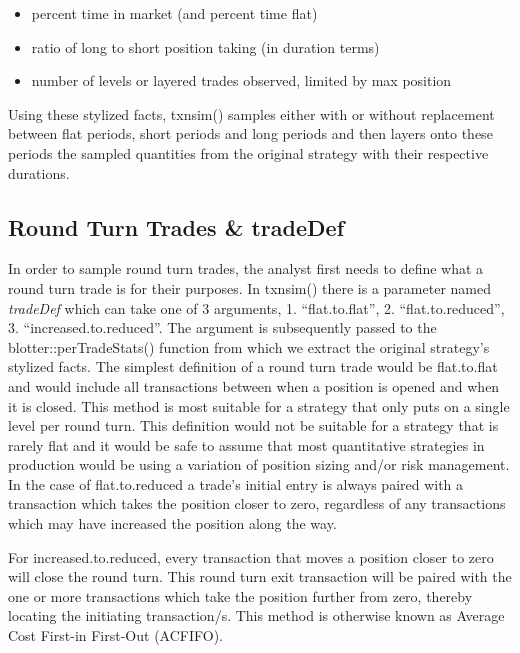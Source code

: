 \begin{itemize}
\tightlist
\item
  percent time in market (and percent time flat)
\item
  ratio of long to short position taking (in duration terms)
\item
  number of levels or layered trades observed, limited by max position
\end{itemize}

Using these stylized facts, txnsim() samples either with or without
replacement between flat periods, short periods and long periods and
then layers onto these periods the sampled quantities from the original
strategy with their respective durations.

\hypertarget{round-turn-trades-tradedef}{%
\subsection{Round Turn Trades \&
tradeDef}\label{round-turn-trades-tradedef}}

In order to sample round turn trades, the analyst first needs to define
what a round turn trade is for their purposes. In txnsim() there is a
parameter named \emph{tradeDef} which can take one of 3 arguments, 1.
``flat.to.flat'', 2. ``flat.to.reduced'', 3. ``increased.to.reduced''.
The argument is subsequently passed to the blotter::perTradeStats()
function from which we extract the original strategy's stylized facts.
The simplest definition of a round turn trade would be flat.to.flat and
would include all transactions between when a position is opened and
when it is closed. This method is most suitable for a strategy that only
puts on a single level per round turn. This definition would not be
suitable for a strategy that is rarely flat and it would be safe to
assume that most quantitative strategies in production would be using a
variation of position sizing and/or risk management. In the case of
flat.to.reduced a trade's initial entry is always paired with a
transaction which takes the position closer to zero, regardless of any
transactions which may have increased the position along the way.

For increased.to.reduced, every transaction that moves a position closer
to zero will close the round turn. This round turn exit transaction will
be paired with the one or more transactions which take the position
further from zero, thereby locating the initiating transaction/s. This
method is otherwise known as Average Cost First-in First-Out (ACFIFO).

